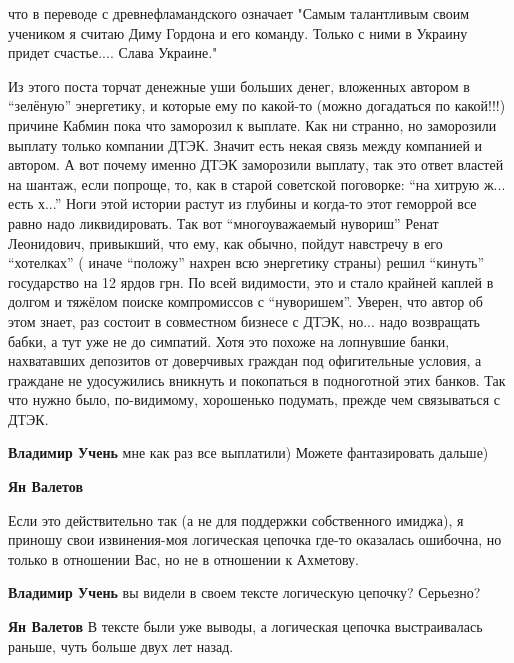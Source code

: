 \begin{itemize}
что в переводе с древнефламандского означает "Самым талантливым своим учеником
я считаю Диму Гордона и его команду. Только с ними в Украину придет
счастье.... Слава Украине."


Из этого поста торчат денежные уши больших денег, вложенных автором в \enquote{зелёную}
энергетику, и которые ему по какой-то (можно догадаться по какой!!!) причине
Кабмин пока что заморозил к выплате. Как ни странно, но заморозили выплату
только компании ДТЭК. Значит есть некая связь между компанией и автором. А вот
почему именно ДТЭК заморозили выплату, так это ответ властей на шантаж, если
попроще, то, как в старой советской поговорке: \enquote{на хитрую ж... есть х...} Ноги
этой истории растут из глубины и когда-то этот геморрой все равно надо
ликвидировать. Так вот \enquote{многоуважаемый нувориш} Ренат Леонидович, привыкший, что
ему, как обычно, пойдут навстречу в его \enquote{хотелках} ( иначе \enquote{положу} нахрен всю
энергетику страны) решил \enquote{кинуть} государство на 12 ярдов грн. По всей
видимости, это и стало крайней каплей в долгом и тяжёлом поиске компромиссов с
\enquote{нуворишем}. Уверен, что автор об этом знает, раз состоит в совместном бизнесе с
ДТЭК, но... надо возвращать бабки, а тут уже не до симпатий. Хотя это похоже на
лопнувшие банки, нахватавших депозитов от доверчивых граждан под офигительные
условия, а граждане не удосужились вникнуть и покопаться в подноготной этих
банков. Так что нужно было, по-видимому, хорошенько подумать, прежде чем
связываться с ДТЭК.

\begin{itemize} %
\textbf{Владимир Учень} мне как раз все выплатили)
Можете фантазировать дальше)

\textbf{Ян Валетов} 

Если это действительно так (а не для поддержки собственного имиджа), я приношу
свои извинения-моя логическая цепочка где-то оказалась ошибочна, но только в
отношении Вас, но не в отношении к Ахметову.

\textbf{Владимир Учень} вы видели в своем тексте логическую цепочку? Серьезно?

\textbf{Ян Валетов} В тексте были уже выводы, а логическая цепочка выстраивалась раньше, чуть больше двух лет назад.

\end{itemize} %



\end{itemize}
